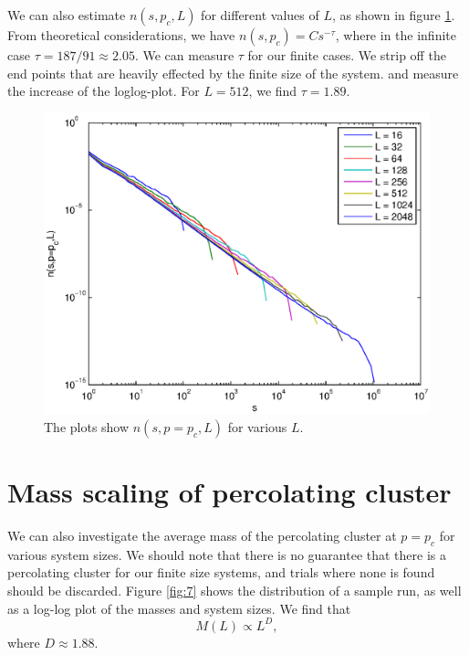 \documentclass[12pt]{article}
\begin{document}
We can also estimate $n(s,p_c,L)$ for different values of $L$, as shown in figure \ref{fig:6}. From theoretical considerations, we have $n(s,p_c) = Cs^{-\tau}$, where in the infinite case $\tau = 187/91 \approx 2.05$. We can measure $\tau$ for our finite cases. We strip off the end points that are heavily effected by the finite size of the system. and measure the increase of the loglog-plot. For $L=512$, we find $\tau = 1.89$.
\begin{figure}[ht]
\centering

	\includegraphics[width=13cm]{differentLs.eps}


\caption[Optional caption for list of figures]{The plots show $n(s,p=p_c,L)$ for various $L$.}
\label{fig:6}
\end{figure}



\section{Mass scaling of percolating cluster}
We can also investigate the average mass of the percolating cluster at $p=p_c$ for various system sizes. We should note that there is no guarantee that there is a percolating cluster for our finite size systems, and trials where none is found should be discarded. Figure \ref{fig:7} shows the distribution of a sample run, as well as a log-log plot of the masses and system sizes. We find that 
\begin{equation}
 M(L) \propto L^{D},
\end{equation}
where $D \approx 1.88$.
\end{document}
